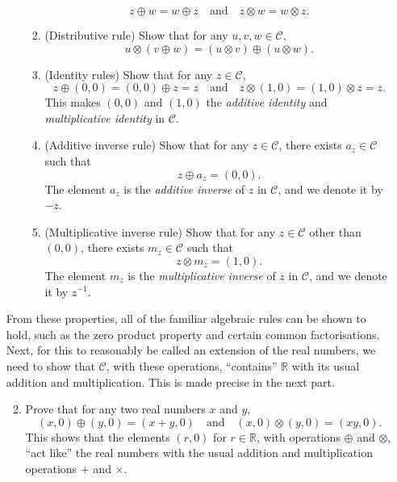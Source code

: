 \begin{enumerate}
\begin{enumerate}
\begin{enumerate}
\begin{equation*}
z\oplus w = w\oplus z\quad\text{and}\quad z\otimes w = w\otimes z.
\end{equation*}
\item (Distributive rule) Show that for any $u,v,w\in\mathcal{C}$,
\begin{equation*}
u\otimes (v\oplus w) = (u\otimes v)\oplus (u\otimes w).
\end{equation*}
\item (Identity rules) Show that for any $z\in\mathcal{C}$,
\begin{equation*}
z\oplus (0,0) = (0,0)\oplus z = z\quad\text{and}\quad z\otimes (1,0) = (1,0)\otimes z = z.
\end{equation*}
This makes $(0,0)$ and $(1,0)$ the \emph{additive identity} and \emph{multiplicative identity} in $\mathcal{C}$.
\item (Additive inverse rule) Show that for any  $z\in\mathcal{C}$, there exists $a_z\in\mathcal{C}$ such that
\begin{equation*}
z\oplus a_z = (0,0).
\end{equation*}
The element $a_z$ is the \emph{additive inverse} of $z$ in $\mathcal{C}$, and we denote it by $-z$.
\item (Multiplicative inverse rule) Show that for any $z\in\mathcal{C}$ other than $(0,0)$, there exists $m_z\in\mathcal{C}$ such that
\begin{equation*}
z\otimes m_z = (1,0).
\end{equation*}
The element $m_z$ is the \emph{multiplicative inverse} of $z$ in $\mathcal{C}$, and we denote it by $z^{-1}$.
\end{enumerate}
\end{enumerate}
From these properties, all of the familiar algebraic rules can be shown to hold, such as the zero product property and certain common factorisations. Next, for this to reasonably be called an extension of the real numbers, we need to show that $\mathcal{C}$, with these operations, ``contains'' $\mathbb{R}$ with its usual addition and multiplication. This is made precise in the next part.
\begin{enumerate}\setcounter{enumii}{1}
\item Prove that for any two real numbers $x$ and $y$,
\begin{equation*}
(x,0)\oplus (y,0) = (x + y,0)\quad\text{and}\quad (x,0)\otimes (y,0) = (xy,0).
\end{equation*}
This shows that the elements $(r,0)$ for $r\in\mathbb{R}$, with operations $\oplus$ and $\otimes$, ``act like'' the real numbers with the usual addition and multiplication operations $+$ and $\times$. 

\end{enumerate}
\end{enumerate}
